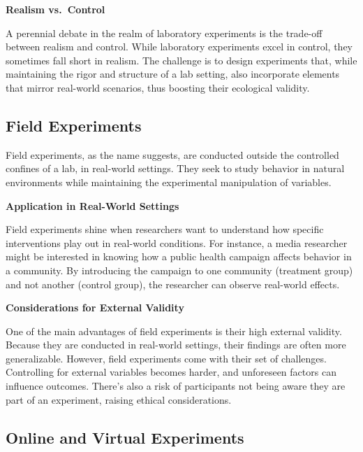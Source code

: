 \documentclass[
  b5paper]{book}
\begin{document}
\textbf{Realism vs.~Control}

A perennial debate in the realm of laboratory experiments is the trade-off between realism and control. While laboratory experiments excel in control, they sometimes fall short in realism. The challenge is to design experiments that, while maintaining the rigor and structure of a lab setting, also incorporate elements that mirror real-world scenarios, thus boosting their ecological validity.

\hypertarget{field-experiments}{%
\subsection*{Field Experiments}\label{field-experiments}}

Field experiments, as the name suggests, are conducted outside the controlled confines of a lab, in real-world settings. They seek to study behavior in natural environments while maintaining the experimental manipulation of variables.

\textbf{Application in Real-World Settings}

Field experiments shine when researchers want to understand how specific interventions play out in real-world conditions. For instance, a media researcher might be interested in knowing how a public health campaign affects behavior in a community. By introducing the campaign to one community (treatment group) and not another (control group), the researcher can observe real-world effects.

\textbf{Considerations for External Validity}

One of the main advantages of field experiments is their high external validity. Because they are conducted in real-world settings, their findings are often more generalizable. However, field experiments come with their set of challenges. Controlling for external variables becomes harder, and unforeseen factors can influence outcomes. There's also a risk of participants not being aware they are part of an experiment, raising ethical considerations.

\hypertarget{online-and-virtual-experiments}{%
\subsection*{Online and Virtual Experiments}\label{online-and-virtual-experiments}}
\end{document}
